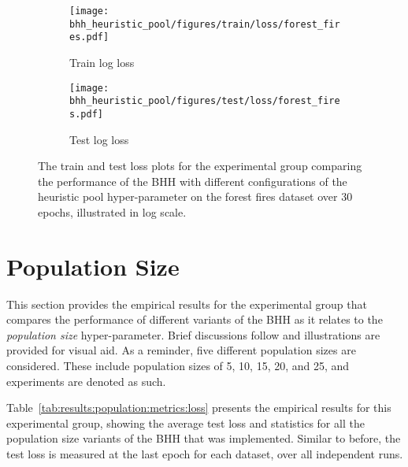 \begin{figure}[htb]
      \begin{subfigure}{0.5\textwidth}
            \centering
            \texttt{[image: bhh\_heuristic\_pool/figures/train/loss/forest\_fires.pdf]}
            \caption{Train log loss}
            \label{fig:results:heuristic_pool:figures:loss:train:forest_fires}
      \end{subfigure}
      \begin{subfigure}{0.5\textwidth}
            \centering
            \texttt{[image: bhh\_heuristic\_pool/figures/test/loss/forest\_fires.pdf]}
            \caption{Test log loss}
            \label{fig:results:heuristic_pool:figures:loss:test:forest_fires}
      \end{subfigure}
      \par\bigskip
      \caption{The train and test loss plots for the experimental group comparing the performance of the \acs{BHH} with different configurations of the heuristic pool hyper-parameter on the forest fires dataset over 30 epochs, illustrated in log scale.}
      \label{fig:results:heuristic_pool:figures:forest_fires}
\end{figure}



\section{Population Size}\label{sec:results:population}

This section provides the empirical results for the experimental group that compares the performance of different variants of the \acs{BHH} as it relates to the \textit{population size} hyper-parameter. Brief discussions follow and illustrations are provided for visual aid. As a reminder, five different population sizes are considered. These include population sizes of 5, 10, 15, 20, and 25, and experiments are denoted as such.

Table~\ref{tab:results:population:metrics:loss} presents the empirical results for this experimental group, showing the average test loss and statistics for all the population size variants of the \acs{BHH} that was implemented. Similar to before, the test loss is measured at the last epoch for each dataset, over all independent runs.

